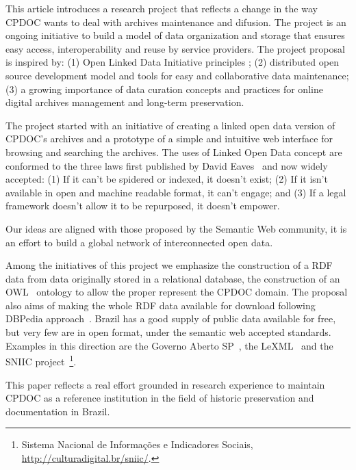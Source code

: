 This article introduces a research project that reflects a change in
the way CPDOC wants to deal with archives maintenance and
difusion. The project is an ongoing initiative to build a model of
data organization and storage that ensures easy access,
interoperability and reuse by service providers. The project proposal
is inspired by: (1) Open Linked Data Initiative principles \cite{odi};
(2) distributed open source development model and tools for easy and
collaborative data maintenance; (3) a growing importance of data
curation concepts and practices for online digital archives management
and long-term preservation.
   
The project started with an initiative of creating a linked open data
version of CPDOC's archives and a prototype of a simple and intuitive
web interface for browsing and searching the archives. The uses of
Linked Open Data concept are conformed to the three laws first
published by David Eaves~\cite{3-law} and now widely accepted: (1) If
it can't be spidered or indexed, it doesn't exist; (2) If it isn't
available in open and machine readable format, it can't engage; and
(3) If a legal framework doesn't allow it to be repurposed, it doesn't
empower.
  
Our ideas are aligned with those proposed by the Semantic Web
community, it is an effort to build a global network of interconnected
open data. 

Among the initiatives of this project we emphasize the construction of
a RDF~\cite{rdf-primer} data from data originally stored in a
relational database, the construction of an OWL~\cite{owl} ontology to
allow the proper represent the CPDOC domain.
The proposal also aims of making the whole RDF data available for
download following DBPedia approach~\cite{dbpedia}. Brazil has a good
supply of public data available for free, but very few are in open
format, under the semantic web accepted standards. Examples in this
direction are the Governo Aberto SP~\cite{gasp}, the
LeXML~\cite{lexml} and the SNIIC project~\footnote{Sistema Nacional de
  Informações e Indicadores Sociais,
  \url{http://culturadigital.br/sniic/}.}.
   
This paper reflects a real effort grounded in research experience to
maintain CPDOC as a reference institution in the field of historic
preservation and documentation in Brazil.


